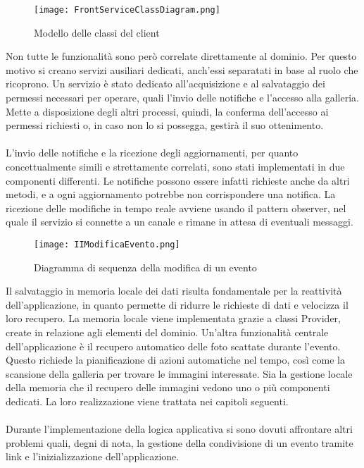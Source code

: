 \clearpage

\begin{figure}[h!]
    \begin{center}
        \texttt{[image: FrontServiceClassDiagram.png]}
        \caption{Modello delle classi del client}
    \end{center}
\end{figure}

Non tutte le funzionalità sono però correlate direttamente al dominio.
Per questo motivo si creano servizi ausiliari dedicati,
anch'essi separatati in base al ruolo che ricoprono.
\clearpage
Un servizio è stato dedicato all'acquisizione e
al salvataggio dei permessi necessari per operare,
quali l'invio delle notifiche e l'accesso alla galleria.
Mette a disposizione degli altri processi, quindi, la conferma dell'accesso ai permessi richiesti o,
in caso non lo si possegga, gestirà il suo ottenimento.\\
\\
L'invio delle notifiche e la ricezione degli aggiornamenti,
per quanto concettualmente simili e strettamente correlati,
sono stati implementati in due componenti differenti.
Le notifiche possono essere infatti richieste anche da altri metodi,
e a ogni aggiornamento potrebbe non corrispondere una notifica.
La ricezione delle modifiche in tempo reale avviene usando il pattern observer,
nel quale il servizio si connette a un canale e rimane in attesa di eventuali messaggi.\\

\begin{figure}[h!]
    \begin{center}
        \texttt{[image: IIModificaEvento.png]}
        \caption{Diagramma di sequenza della modifica di un evento}
    \end{center}
\end{figure}

\clearpage

Il salvataggio in memoria locale dei dati risulta fondamentale per la reattività dell'applicazione,
in quanto permette di ridurre le richieste di dati e velocizza il loro recupero.
La memoria locale viene implementata grazie a classi Provider, create in relazione agli elementi del dominio.
Un'altra funzionalità centrale dell'applicazione è il recupero automatico
delle foto scattate durante l'evento.
Questo richiede la pianificazione di azioni automatiche nel tempo,
così come la scansione della galleria per trovare le immagini interessate.
Sia la gestione locale della memoria che il recupero delle immagini vedono uno o più componenti dedicati.
La loro realizzazione viene trattata nei capitoli seguenti.\\
\\
Durante l'implementazione della logica applicativa
si sono dovuti affrontare altri problemi quali, degni di nota,
la gestione della condivisione di un evento tramite link e
l'inizializzazione dell'applicazione.\\


